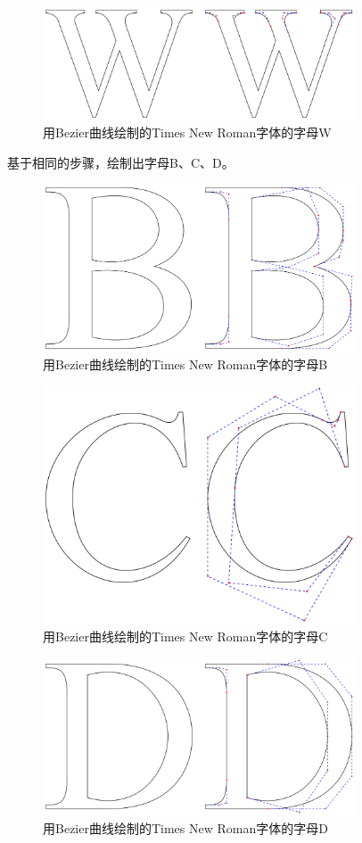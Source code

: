 \documentclass{ctexart}
\begin{document}
\begin{figure}[htbp]
    \centering
    \includegraphics[width=25em]{WW.png}
    \caption{用Bezier曲线绘制的Times New Roman字体的字母W}
    \label{fig:plot4}
\end{figure}

基于相同的步骤，绘制出字母B、C、D。

\begin{figure}[htbp]
    \centering
    \includegraphics[width=25em]{BB.png}
    \caption{用Bezier曲线绘制的Times New Roman字体的字母B}
    \label{fig:plot5}
\end{figure}

\begin{figure}[htbp]
    \centering
    \includegraphics[width=25em]{CC.png}
    \caption{用Bezier曲线绘制的Times New Roman字体的字母C}
    \label{fig:plot6}
\end{figure}

\begin{figure}[htbp]
    \centering
    \includegraphics[width=25em]{DD.png}
    \caption{用Bezier曲线绘制的Times New Roman字体的字母D}
    \label{fig:plot7}
\end{figure}
\end{document}
